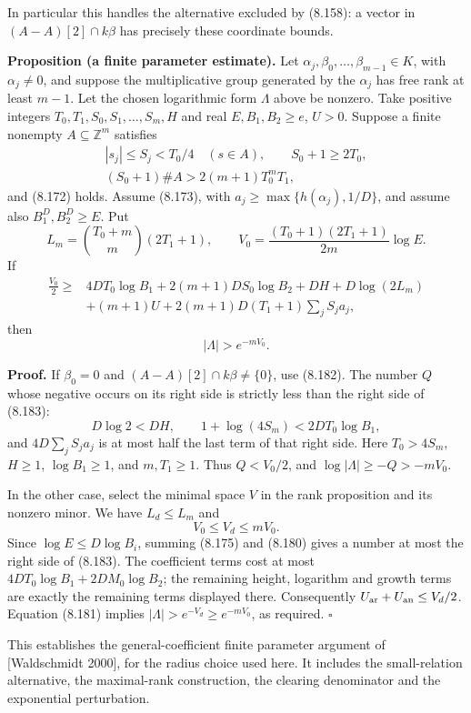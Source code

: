 \documentclass[
  11pt,
  a4paper,
]{article}
\begin{document}
In particular this handles the alternative excluded by (8.158): a vector
in \((A-A)[2]\cap k\beta\) has precisely these coordinate bounds.

\textbf{Proposition (a finite parameter estimate).} Let
\(\alpha_j,\beta_0,\ldots,\beta_{m-1}\in K\), with \(\alpha_j\ne0\), and
suppose the multiplicative group generated by the \(\alpha_j\) has free
rank at least \(m-1\). Let the chosen logarithmic form \(\Lambda\) above
be nonzero. Take positive integers \(T_0,T_1,S_0,S_1,\ldots,S_m,H\) and
real \(E,B_1,B_2\ge e\), \(U>0\). Suppose a finite nonempty
\(A\subseteq\mathbb Z^m\) satisfies \[
\begin{gathered}
|s_j|\le S_j<T_0/4\quad(s\in A),\qquad S_0+1\ge2T_0,\\
(S_0+1)\#A>2(m+1)T_0^mT_1,
\end{gathered}
\] and (8.172) holds. Assume (8.173), with
\(a_j\ge\max\{h(\alpha_j),1/D\}\), and assume also \(B_1^D,B_2^D\ge E\).
Put \[
L_m=\binom{T_0+m}{m}(2T_1+1),\qquad
V_0=\frac{(T_0+1)(2T_1+1)}{2m}\log E.
\] If \[
\begin{split}
\frac{V_0}{2}\ge{}&
4DT_0\log B_1+2(m+1)DS_0\log B_2
+DH+D\log(2L_m)\\
&+(m+1)U
+2(m+1)D(T_1+1)\sum_jS_ja_j,
\end{split}
\tag{8.183}
\] then \[
|\Lambda|>e^{-mV_0}.
\tag{8.184}
\]

\textbf{Proof.} If \(\beta_0=0\) and \((A-A)[2]\cap k\beta\ne\{0\}\),
use (8.182). The number \(Q\) whose negative occurs on its right side is
strictly less than the right side of (8.183): \[
D\log2<DH,\qquad
1+\log(4S_m)<2DT_0\log B_1,
\] and \(4D\sum_jS_ja_j\) is at most half the last term of that right
side. Here \(T_0>4S_m\), \(H\ge1\), \(\log B_1\ge1\), and \(m,T_1\ge1\).
Thus \(Q<V_0/2\), and \(\log|\Lambda|\ge-Q>-mV_0\).

In the other case, select the minimal space \(V\) in the rank
proposition and its nonzero minor. We have \(L_d\le L_m\) and \[
V_0\le V_d\le mV_0.
\] Since \(\log E\le D\log B_i\), summing (8.175) and (8.180) gives a
number at most the right side of (8.183). The coefficient terms cost at
most \(4DT_0\log B_1+2DM_0\log B_2\); the remaining height, logarithm
and growth terms are exactly the remaining terms displayed there.
Consequently \(U_{\rm ar}+U_{\rm an}\le V_d/2\). Equation (8.181)
implies \(|\Lambda|>e^{-V_d}\ge e^{-mV_0}\), as required. \(\square\)

This establishes the general-coefficient finite parameter argument of
{[}Waldschmidt 2000{]}, for the radius choice used here. It includes the
small-relation alternative, the maximal-rank construction, the clearing
denominator and the exponential perturbation.
\end{document}
